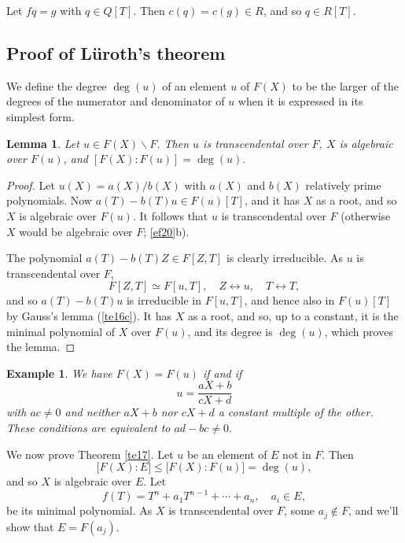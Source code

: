 \documentclass[a4paper,11pt,final,openany]{memoir}
\newtheorem{lemma}[X]{Lemma}
\newtheorem{example}[X]{Example}
\theoremstyle{nonumberplain}
\newtheorem{proof}{Proof.}
\begin{document}
\noindent Let $fq=g$ with $q\in Q[T]$. Then $c(q)=c(g)\in R$, and so $q\in
R[T]$.

\subsection{Proof of L\"{u}roth's theorem}

We define the degree $\deg(u)$ of an element $u$ of $F(X)$ to be the larger of
the degrees of the numerator and denominator of $u$ when it is expressed in
its simplest form.

\begin{lemma}
\label{te17a}Let $u\in F(X)\smallsetminus F$. Then $u$ is transcendental over
$F$, $X$ is algebraic over $F(u)$, and $[F(X)\colon F(u)]=\deg(u).$
\end{lemma}

\begin{proof}
Let $u(X)=a(X)/b(X)$ with $a(X)$ and $b(X)$ relatively prime polynomials. Now
$a(T)-b(T)u\in F(u)[T]$, and it has $X$ as a root, and so $X$ is algebraic
over $F(u)$. It follows that $u$ is transcendental over $F$ (otherwise $X$
would be algebraic over $F$; \ref{ef20}b).

The polynomial $a(T)-b(T)Z\in F[Z,T]$ is clearly irreducible. As $u$ is
transcendental over $F$,
\[
F[Z,T]\simeq F[u,T],\quad Z\leftrightarrow u,\quad T\leftrightarrow T,
\]
and so $a(T)-b(T)u$ is irreducible in $F[u,T]$, and hence also in $F(u)[T]$ by
Gauss's lemma (\ref{te16c}). It has $X$ as a root, and so, up to a constant,
it is the minimal polynomial of $X$ over $F(u)$, and its degree is $\deg(u)$,
which proves the lemma.
\end{proof}

\begin{example}
\label{te17b}We have $F(X)=F(u)$ if and if
\[
u=\frac{aX+b}{cX+d}%
\]
with $ac\neq0$ and neither $aX+b$ nor $cX+d$ a constant multiple of the other.
These conditions are equivalent to $ad-bc\neq0.$
\end{example}

We now prove Theorem \ref{te17}. Let $u$ be an element of $E$ not in $F$. Then%
\[
\lbrack F(X)\colon E]\leq\lbrack F(X)\colon F(u)]=\deg(u),
\]
and so $X$ is algebraic over $E$. Let%
\[
f(T)=T^{n}+a_{1}T^{n-1}+\cdots+a_{n},\quad a_{i}\in E,
\]
be its minimal polynomial. As $X$ is transcendental over $F$, some
$a_{j}\notin F$, and we'll show that $E=F(a_{j})$.
\end{document}
